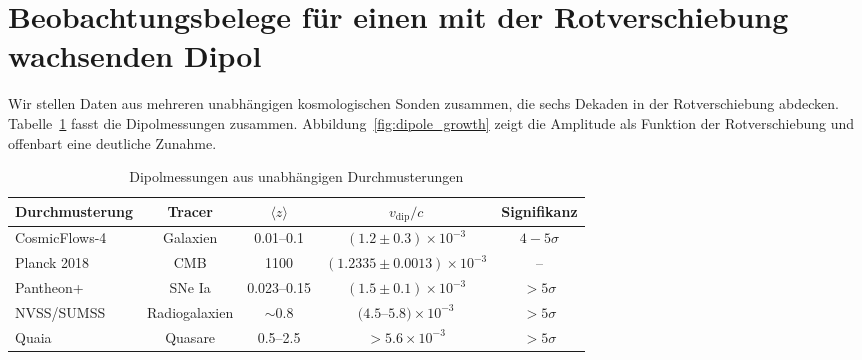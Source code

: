 \documentclass[11pt,a4paper]{article}
\begin{document}
	\section{Beobachtungsbelege für einen mit der Rotverschiebung wachsenden Dipol}
	
	Wir stellen Daten aus mehreren unabhängigen kosmologischen Sonden zusammen, die sechs Dekaden in der Rotverschiebung abdecken. Tabelle~\ref{tab:dipoles} fasst die Dipolmessungen zusammen. Abbildung~\ref{fig:dipole_growth} zeigt die Amplitude als Funktion der Rotverschiebung und offenbart eine deutliche Zunahme.
	
	\begin{table}[htbp]
		\centering
		\caption{Dipolmessungen aus unabhängigen Durchmusterungen}
		\label{tab:dipoles}
		\begin{tabular}{lcccc}
			\toprule
			\textbf{Durchmusterung} & \textbf{Tracer} & \(\langle z \rangle\) & \(v_{\text{dip}}/c\) & \textbf{Signifikanz} \\
			\midrule
			CosmicFlows-4 \cite{Watkins2023} & Galaxien & 0.01--0.1 & \((1.2 \pm 0.3) \times 10^{-3}\) & \(4-5\sigma\) \\
			Planck 2018 \cite{Planck2018VII} & CMB & 1100 & \((1.2335 \pm 0.0013) \times 10^{-3}\) & -- \\
			Pantheon+ \cite{Sah2025} & SNe Ia & 0.023--0.15 & \((1.5 \pm 0.1) \times 10^{-3}\) & \(>5\sigma\) \\
			NVSS/SUMSS \cite{Colin2017} & Radiogalaxien & \(\sim0.8\) & \((4.5\)--\(5.8) \times 10^{-3}\) & \(>5\sigma\) \\
			Quaia \cite{Secrest2025} & Quasare & 0.5--2.5 & \(>5.6 \times 10^{-3}\) & \(>5\sigma\) \\
			\bottomrule
		\end{tabular}
	\end{table}
	
\end{document}
